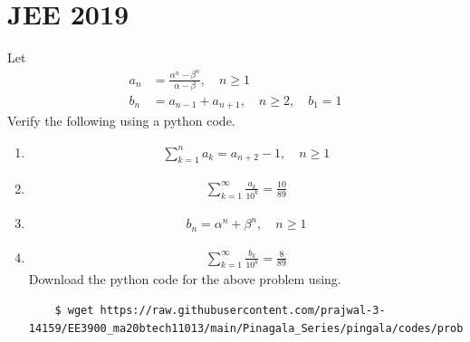 \documentclass[journal,12pt,twocolumn]{IEEEtran}
\renewcommand\thesection{\arabic{section}}
\begin{document}
\section{JEE 2019}
Let 
\begin{align}
a_n &= \frac{\alpha^{n}-\beta^{n}}{\alpha - \beta}, \quad n \ge 1
\\
b_n &= a_{n-1} + a_{n+1}, \quad n \ge 2, \quad b_1 =1
\label{eq:10-orig-diff}
\end{align}
Verify the following using a python code.
\begin{enumerate}[label=\thesection.\arabic*
,ref=\thesection.\theenumi]
\item 
\begin{align}
	\sum_{k=1}^{n}a_k = a_{n+2}-1, \quad n \ge 1
\end{align}
\item 
\begin{align}
	\sum_{k=1}^{\infty}\frac{a_k}{10^k} =\frac{10}{89}
\end{align}
\item 
\begin{align}
	b_n =\alpha^n + \beta^n, \quad n \ge 1
\end{align}
\item 
\begin{align}
	\sum_{k=1}^{\infty}\frac{b_k}{10^k} =\frac{8}{89}
\end{align}
\solution Download the python code for the above problem using.
\begin{lstlisting}
	$ wget https://raw.githubusercontent.com/prajwal-3-14159/EE3900_ma20btech11013/main/Pinagala_Series/pingala/codes/problem_1.py
\end{lstlisting}
\end{enumerate}
\end{document}
